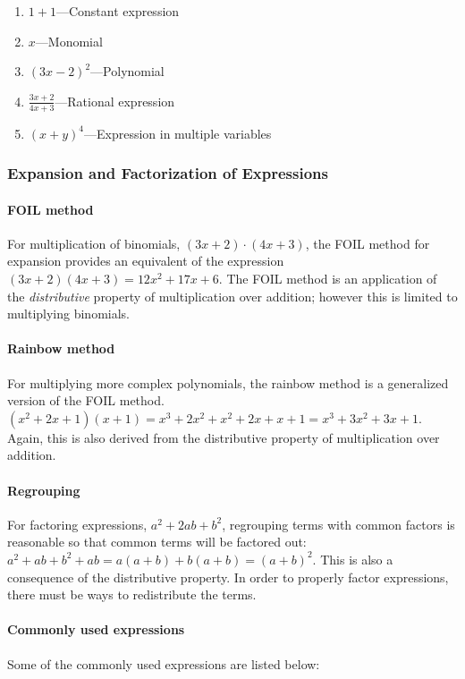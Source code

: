 \begin{enumerate}
    \item $1 + 1$---Constant expression
    \item $x$---Monomial
    \item $(3x - 2)^2$---Polynomial
    \item $\frac{3x+2}{4x+3}$---Rational expression
    \item $(x+y)^4$---Expression in multiple variables
\end{enumerate}

\subsubsection{Expansion and Factorization of Expressions}

\paragraph{FOIL method} For multiplication of binomials, $(3x+2)\cdot(4x+3)$, the FOIL method for expansion provides an equivalent of the expression $(3x+2)(4x+3) = 12x^2+17x+6$. 
The FOIL method is an application of the \emph{distributive} property of multiplication over addition; however this is limited to multiplying binomials.

\paragraph{Rainbow method} For multiplying more complex polynomials, the rainbow method is a generalized version of the FOIL method. $(x^2+2x+1)(x+1) = x^3 + 2x^2 + x^2 + 2x + x + 1 = x^3 + 3x^2 + 3x + 1$. Again, this is also derived from the distributive property of multiplication over addition.

\paragraph{Regrouping} For factoring expressions, $a^2 + 2ab + b^2$, regrouping terms with common factors is reasonable so that common terms will be factored out: $a^2 + ab + b^2 + ab = a(a+b) + b(a+b) = (a+b)^2$.
This is also a consequence of the distributive property.
In order to properly factor expressions, there must be ways to redistribute the terms.

\paragraph{Commonly used expressions}
Some of the commonly used expressions are listed below:

